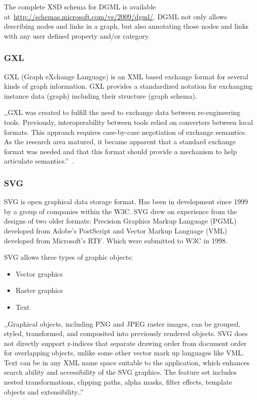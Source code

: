 The complete XSD schema for DGML is available at~\url{http://schemas.microsoft.com/vs/2009/dgml/}. DGML not only allows describing nodes and links in a graph, but also annotating those nodes and links with any user defined property and/or category.

\subsubsection{GXL}
GXL (Graph eXchange Language) is an XML based exchange format for several kinds of graph information. GXL provides a standardized notation for exchanging instance data (graph) including their structure (graph schema).

,,GXL was created to fulfill the need to exchange data between re-engineering tools. Previously, interoperability between tools relied on converters between local formats. This approach requires case-by-case negotiation of exchange semantics. As the research area matured, it became apparent that a standard exchange format was needed and that this format should provide a mechanism to help articulate semantics.''~\cite{GXL}.

\subsubsection{SVG}
SVG is open graphical data storage format. Has been in development since 1999 by a group of companies within the W3C. SVG drew on experience from the designs of two older formats: Precision Graphics Markup Language (PGML) developed from Adobe's PostScript and Vector Markup Language (VML) developed from Microsoft's RTF. Which were submitted to W3C in 1998.


SVG allows three types of graphic objects:
\begin{itemize}
\item Vector graphics
\item Raster graphics
\item Text
\end{itemize}

,,Graphical objects, including PNG and JPEG raster images, can be grouped, styled, transformed, and composited into previously rendered objects. SVG does not directly support z-indices that separate drawing order from document order for overlapping objects, unlike some other vector mark up languages like VML. Text can be in any XML name space suitable to the application, which enhances search ability and accessibility of the SVG graphics. The feature set includes nested transformations, clipping paths, alpha masks, filter effects, template objects and extensibility..''~\cite{SVG}
